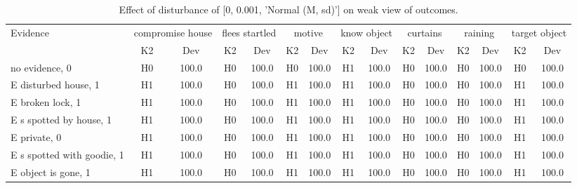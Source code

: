 \begin{table}\begin{tabular}{l|cc|cc|cc|cc|cc|cc|cc}\toprule\multirow{2}{*}{Evidence} & \multicolumn{2}{c}{compromise house}& \multicolumn{2}{c}{flees startled}& \multicolumn{2}{c}{motive}& \multicolumn{2}{c}{know object}& \multicolumn{2}{c}{curtains}& \multicolumn{2}{c}{raining}& \multicolumn{2}{c}{target object}\\& {K2} & {Dev}& {K2} & {Dev}& {K2} & {Dev}& {K2} & {Dev}& {K2} & {Dev}& {K2} & {Dev}& {K2} & {Dev}\\\midrule
no evidence, 0 & H0&100.0&H0&100.0&H0&100.0&H1&100.0&H0&100.0&H0&100.0&H0&100.0\\E disturbed house, 1 & H1&100.0&H0&100.0&H1&100.0&H1&100.0&H0&100.0&H0&100.0&H1&100.0\\E broken lock, 1 & H1&100.0&H0&100.0&H1&100.0&H1&100.0&H0&100.0&H0&100.0&H1&100.0\\E s spotted by house, 1 & H1&100.0&H0&100.0&H1&100.0&H1&100.0&H0&100.0&H0&100.0&H1&100.0\\E private, 0 & H1&100.0&H0&100.0&H1&100.0&H1&100.0&H0&100.0&H0&100.0&H1&100.0\\E s spotted with goodie, 1 & H1&100.0&H0&100.0&H1&100.0&H1&100.0&H0&100.0&H0&100.0&H1&100.0\\E object is gone, 1 & H1&100.0&H0&100.0&H1&100.0&H1&100.0&H0&100.0&H0&100.0&H1&100.0\\\bottomrule\end{tabular}\caption{Effect of disturbance of [0, 0.001, 'Normal (M, sd)'] on weak view of outcomes.}\end{table}